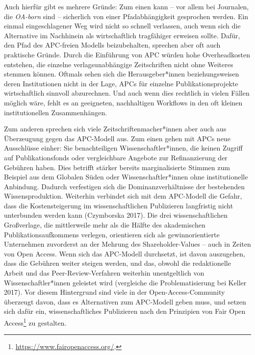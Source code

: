 \documentclass[a4paper,
fontsize=11pt,
oneside,
numbers=noperiodatend,
parskip=half-,
bibliography=totoc,
final
]{scrartcl}
\begin{document}
Auch hierfür gibt es mehrere Gründe: Zum einen kann -- vor allem bei
Journalen, die \emph{OA-born} sind -- sicherlich von einer
Pfadabhängigkeit gesprochen werden. Ein einmal eingeschlagener Weg wird
nicht so schnell verlassen, auch wenn sich die Alternative im Nachhinein
als wirtschaftlich tragfähiger erweisen sollte. Dafür, den Pfad des
APC-freien Modells beizubehalten, sprechen aber oft auch praktische
Gründe. Durch die Einführung von APC würden hohe Overheadkosten
entstehen, die einzelne verlagsunabhängige Zeitschriften nicht ohne
Weiteres stemmen können. Oftmals sehen sich die Herausgeber*innen
beziehungsweisen deren Institutionen nicht in der Lage, APCs für
einzelne Publikationsprojekte wirtschaftlich sinnvoll abzurechnen. Und
auch wenn dies rechtlich in vielen Fällen möglich wäre, fehlt es an
geeigneten, nachhaltigen Workflows in den oft kleinen institutionellen
Zusammenhängen.

Zum anderen sprechen sich viele Zeitschriftenmacher*innen aber auch aus
Überzeugung gegen das APC-Modell aus. Zum einen gehen mit APCs neue
Ausschlüsse einher: Sie benachteiligen Wissenschaftler*innen, die keinen
Zugriff auf Publikationsfonds oder vergleichbare Angebote zur
Refinanzierung der Gebühren haben. Dies betrifft stärker bereits
marginalisierte Stimmen zum Beispiel aus dem Globalen Süden oder
Wissenschaftler*innen ohne institutionelle Anbindung. Dadurch
verfestigen sich die Dominanzverhältnisse der bestehenden
Wissensproduktion. Weiterhin verbindet sich mit dem APC-Modell die
Gefahr, dass die Kostensteigerung im wissenschaftlichen Publizieren
langfristig nicht unterbunden werden kann (Czymborska 2017). Die drei
wissenschaftlichen Großverlage, die mittlerweile mehr als die Hälfte des
akademischen Publikationsaufkommens verlegen, orientieren sich als
gewinnorientierte Unternehmen zuvorderst an der Mehrung des
Shareholder-Values -- auch in Zeiten von Open Access. Wenn sich das
APC-Modell durchsetzt, ist davon auszugehen, dass die Gebühren weiter
steigen werden, und das, obwohl die redaktionelle Arbeit und das
Peer-Review-Verfahren weiterhin unentgeltlich von Wissenschaftler*innen
geleistet wird (vergleiche die Problematisierung bei Keller 2017). Vor
diesem Hintergrund sind viele in der Open-Access-Community überzeugt
davon, dass es Alternativen zum APC-Modell geben muss, und setzen sich
dafür ein, wissenschaftliches Publizieren nach den Prinzipien von Fair
Open Access\footnote{\url{https://www.fairopenaccess.org/}.} zu
gestalten.
\end{document}

